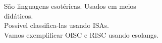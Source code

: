 \documentclass[preview]{standalone}
\begin{document}
São linguagens esotéricas. Usados em meios\\ didáticos.\\Possivel classifica-las usando ISAs.\\Vamos exemplificar OISC e RISC usando esolangs.\\
\end{document}
